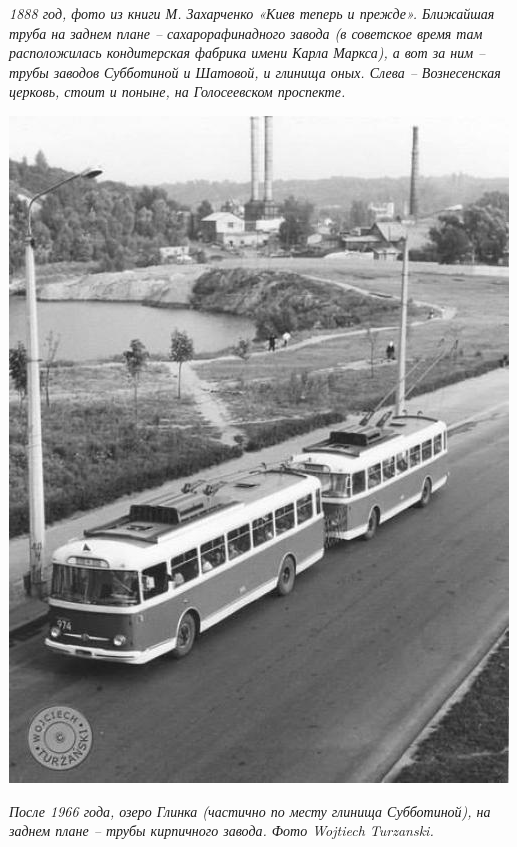 \textit{1888 год, фото из книги М. Захарченко «Киев теперь и прежде». Ближайшая труба на заднем плане – сахарорафинадного завода (в советское время там расположилась кондитерская фабрика имени Карла Маркса), а вот за ним – трубы заводов Субботиной и Шатовой, и глинища оных. Слева – Вознесенская церковь, стоит и поныне, на Голосеевском проспекте.}
\vspace*{\fill}
\newpage
\vspace*{\fill}
\begin{center}
\includegraphics[width=\linewidth]{pix/woitech.jpg}
\end{center} 

\textit{После 1966 года, озеро Глинка (частично по месту глинища Субботиной), на заднем плане – трубы кирпичного завода. Фото Wojtiech Turzanski.}
\vspace*{\fill}
\newpage

